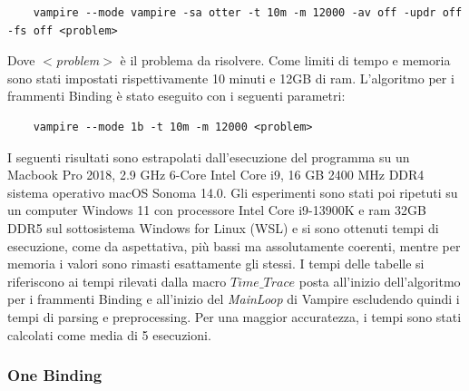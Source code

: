 \documentclass[./main.tex]{subfiles}
\begin{document}
{
\small    
\begin{verbatim}
    vampire --mode vampire -sa otter -t 10m -m 12000 -av off -updr off -fs off <problem>
\end{verbatim}}
Dove \textit{$<$problem$>$} è il problema da risolvere. 
Come limiti di tempo e memoria sono stati impostati rispettivamente 10 minuti e 12GB di ram.
L'algoritmo per i frammenti Binding è stato eseguito con i seguenti parametri:
{
\small    
\begin{verbatim}
    vampire --mode 1b -t 10m -m 12000 <problem>
\end{verbatim}}
I seguenti risultati sono estrapolati dall'esecuzione del programma su un 
Macbook Pro 2018, 2.9 GHz 6-Core Intel Core i9, 16 GB 2400 MHz DDR4 sistema operativo macOS Sonoma 14.0.
Gli esperimenti sono stati poi ripetuti su un computer Windows 11 con processore Intel Core i9-13900K e ram 32GB DDR5
sul sottosistema Windows for Linux (WSL) e si sono ottenuti tempi di esecuzione, come da aspettativa, più bassi ma assolutamente coerenti,
mentre per memoria i valori sono rimasti esattamente gli stessi.
I tempi delle tabelle si riferiscono ai tempi rilevati dalla macro $Time\_Trace$ posta all'inizio dell'algoritmo per i frammenti Binding 
e all'inizio del \textit{MainLoop} di Vampire escludendo quindi i tempi di parsing e preprocessing.
Per una maggior accuratezza, i tempi sono stati calcolati come media di 5 esecuzioni.

\subsubsection{One Binding}

\end{document}
